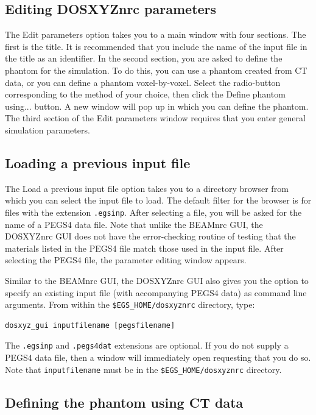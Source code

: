 \documentclass[12pt,twoside]{article}
\begin{document}
\subsection{Editing DOSXYZnrc parameters}

The {\sf Edit parameters} option takes you to a main window with four
sections.  The first is the title.  It is recommended that you include
the name of the input file in the title as an identifier.  In the second
section, you are asked
to define the phantom for the simulation.  To do this, you can use a
phantom created from CT data, or you can define a phantom
voxel-by-voxel.  Select the radio-button corresponding to the method of
your choice, then click the {\sf Define phantom using...} button.  A new
window will pop up in which you can define the phantom.
The third section of the {\sf Edit parameters} window requires that you
enter general simulation parameters.

\subsection{Loading a previous input file}

The {\sf Load a previous input file} option takes you to a directory
browser from which you can select the input file to load.  The default
filter for the browser is for files with the extension {\tt .egsinp}.
After selecting a file, you will be asked for the name of a PEGS4 data
file.  Note that unlike the BEAMnrc GUI, the DOSXYZnrc GUI does not have the
error-checking routine of testing that the materials listed in the PEGS4
file match those used in the input file.  After selecting the PEGS4
file, the parameter editing window appears.

Similar to the BEAMnrc GUI, the DOSXYZnrc GUI also gives you the option
to specify an existing input file (with accompanying PEGS4 data) as command
line arguments.  From within the {\tt \$EGS\_HOME/dosxyznrc} directory, type:
\begin{verbatim}
dosxyz_gui inputfilename [pegsfilename]
\end{verbatim}
The {\tt .egsinp} and {\tt .pegs4dat} extensions are optional.  If you do not
supply a PEGS4 data file, then a window will immediately open requesting that you
do so.  Note that {\tt inputfilename} must be in the {\tt \$EGS\_HOME/dosxyznrc}
directory.

\subsection{Defining the phantom using CT data}
\end{document}
